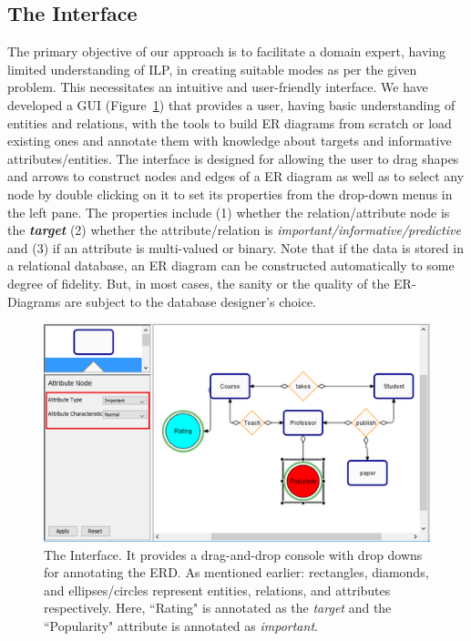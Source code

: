 \documentclass[sigconf]{acmart}
\begin{document}
\subsection{The Interface}
The primary objective of our approach is to facilitate a domain expert, having limited understanding of ILP, in creating suitable modes as per the given problem. This necessitates an intuitive and user-friendly interface. We have developed a GUI (Figure~\ref{fig:interface}) that provides a user, having basic understanding of entities and relations, with the tools to build ER diagrams from scratch or load existing ones and annotate them with knowledge about targets and informative attributes/entities. The interface is designed for allowing the user to drag shapes and arrows to construct nodes and edges of a ER diagram as well as to select any node by double clicking on it to set its properties from the drop-down menus in the left pane. The properties include (1) whether the relation/attribute node is the \textit{\textbf{target}} (2) whether the attribute/relation is \textit{important/informative/predictive} and (3) if an attribute is multi-valued or binary.  Note that if the data is stored in a relational database, an ER diagram can be constructed automatically to some degree of fidelity. But, in most cases, the sanity or the quality of the ER-Diagrams are subject to the database designer's choice.

\begin{figure}[ht]
    \centering
    \includegraphics[width=\columnwidth]{images/GUI.png}
    \caption{The Interface. It provides a drag-and-drop console with drop downs for annotating the ERD. As mentioned earlier: rectangles, diamonds, and ellipses/circles represent entities, relations, and attributes respectively. Here, ``Rating" is annotated as the \textit{target} and the ``Popularity" attribute is annotated as \textit{important}.}
    \label{fig:interface}
\end{figure}
\end{document}
